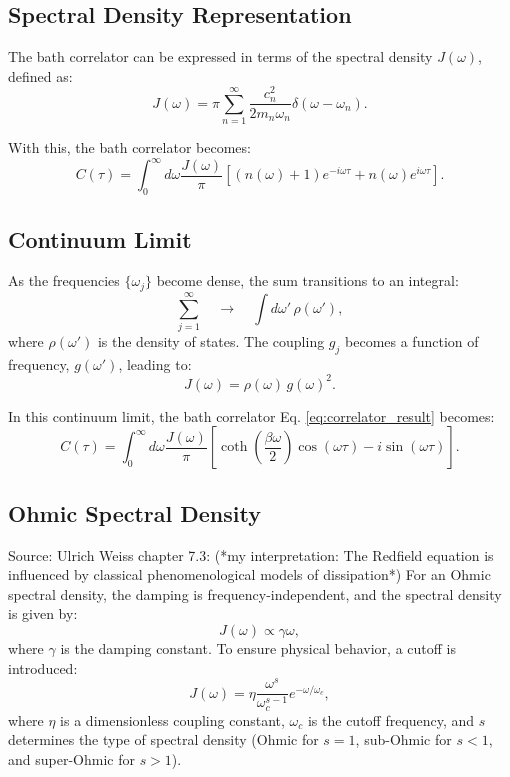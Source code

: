 \subsection{Spectral Density Representation}
\label{subsec:spectral_density}

The bath correlator can be expressed in terms of the spectral density \( J(\omega) \), defined as:
\begin{equation} \label{eq:bath_spectral_density}
	J(\omega) = \pi \sum_{n=1}^{\infty} \frac{c_n^2}{2 m_n \omega_n} \delta(\omega - \omega_n).
\end{equation}

With this, the bath correlator becomes:
\begin{equation} \label{eq:correlator_spectral_density}
	C(\tau) = \int_0^\infty d\omega \frac{J(\omega)}{\pi} \left[ (n(\omega) + 1) e^{-i \omega \tau} + n(\omega) e^{i \omega \tau} \right].
\end{equation}

\subsection{Continuum Limit}
As the frequencies \( \{\omega_j\} \) become dense, the sum transitions to an integral:
\[
	\sum_{j=1}^{\infty} \quad \longrightarrow \quad \int d\omega'\,\rho(\omega'),
\]
where \( \rho(\omega') \) is the density of states. The coupling \( g_j \) becomes a function of frequency, \( g(\omega') \), leading to:
\[
	J(\omega) = \rho(\omega)\,g(\omega)^2.
\]

In this continuum limit, the bath correlator Eq. \eqref{eq:correlator_result} becomes:
\begin{equation} \label{eq:correlator_final}
	C(\tau) = \int_0^\infty d\omega \frac{J(\omega)}{\pi} \left[ \coth\left( \frac{\beta \omega}{2} \right) \cos(\omega \tau) - i \sin(\omega \tau) \right].
\end{equation}

\subsection{Ohmic Spectral Density}
\label{subsec:ohmic_spectral_density}

Source: Ulrich Weiss chapter 7.3:
(*my interpretation: The Redfield equation is influenced by classical phenomenological models of dissipation*)
For an Ohmic spectral density, the damping is frequency-independent, and the spectral density is given by:
\begin{equation} \label{eq:ohmic_spectral_density}
	J(\omega) \propto \gamma \omega,
\end{equation}
where \( \gamma \) is the damping constant. To ensure physical behavior, a cutoff is introduced:
\begin{equation} \label{eq:cutoff_spectral_density}
	J(\omega) = \eta \frac{\omega^s}{\omega_c^{s-1}} e^{-\omega / \omega_c},
\end{equation}
where \( \eta \) is a dimensionless coupling constant, \( \omega_c \) is the cutoff frequency, and \( s \) determines the type of spectral density (Ohmic for \( s = 1 \), sub-Ohmic for \( s < 1 \), and super-Ohmic for \( s > 1 \)).
